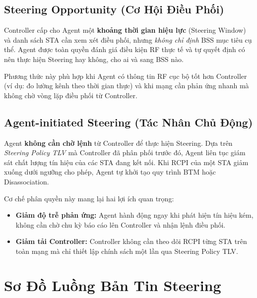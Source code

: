 \subsection{Steering Opportunity (Cơ Hội Điều Phối)}

Controller cấp cho Agent một \textbf{khoảng thời gian hiệu lực} (Steering Window) và
danh sách STA cần xem xét điều phối, nhưng \textit{không chỉ định} BSS mục tiêu cụ
thể. Agent được toàn quyền đánh giá điều kiện RF thực tế và tự quyết định có nên thực
hiện Steering hay không, cho ai và sang BSS nào.

Phương thức này phù hợp khi Agent có thông tin RF cục bộ tốt hơn Controller (ví dụ:
đo lường kênh theo thời gian thực) và khi mạng cần phản ứng nhanh mà không chờ
vòng lặp điều phối từ Controller.


\subsection{Agent-initiated Steering (Tác Nhân Chủ Động)}

Agent \textbf{không cần chờ lệnh} từ Controller để thực hiện Steering. Dựa trên
\textit{Steering Policy TLV} mà Controller đã phân phối trước đó, Agent liên tục
giám sát chất lượng tín hiệu của các STA đang kết nối. Khi RCPI của một STA giảm
xuống dưới ngưỡng cho phép, Agent tự khởi tạo quy trình BTM hoặc Disassociation.

Cơ chế phân quyền này mang lại hai lợi ích quan trọng:
\begin{itemize}
	\item \textbf{Giảm độ trễ phản ứng:} Agent hành động ngay khi phát hiện tín hiệu
	kém, không cần chờ chu kỳ báo cáo lên Controller và nhận lệnh điều phối.
	\item \textbf{Giảm tải Controller:} Controller không cần theo dõi RCPI từng STA
	trên toàn mạng mà chỉ thiết lập chính sách một lần qua Steering Policy TLV.
\end{itemize}


\section{Sơ Đồ Luồng Bản Tin Steering}

